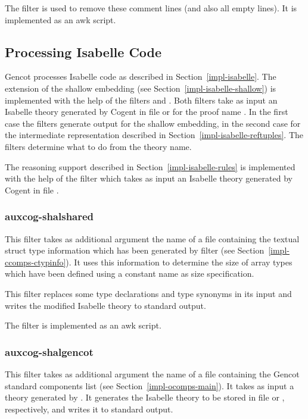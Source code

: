 The filter  is used to remove these comment lines (and also all empty lines). It is implemented
as an awk script.

\subsection{Processing Isabelle Code}
\label{impl-ocomps-isabelle}

Gencot processes Isabelle code as described in Section~\ref{impl-isabelle}. The extension of the shallow embedding
(see Section~\ref{impl-isabelle-shallow}) is implemented with the help of the filters  and
. Both filters take as input an Isabelle theory generated by Cogent in file
 or  for the proof name . In the first case
the filters generate output for the shallow embedding, in the second case for the intermediate representation
described in Section~\ref{impl-isabelle-reftuples}. The filters determine what to do from the theory name.

The reasoning support described in Section~\ref{impl-isabelle-rules} is implemented with the help of the filter
 which takes as input an Isabelle theory generated by Cogent in file
.

\subsubsection{auxcog-shalshared}

This filter takes as additional argument the name of a file containing the textual struct type information which 
has been generated by filter  (see Section~\ref{impl-ccomps-ctypinfo}). It uses this 
information to determine the size of array types which have been defined using a constant name as size specification.

This filter replaces some type declarations and type synonyms in its input and writes the modified Isabelle theory
to standard output.

The filter is implemented as an awk script.

\subsubsection{auxcog-shalgencot}

This filter takes as additional argument the name of a file containing the Gencot standard components list (see 
Section~\ref{impl-ocomps-main}). It takes as input a theory generated by . 
It generates the Isabelle theory to be stored in file 
or , respectively, and writes it to standard output.

